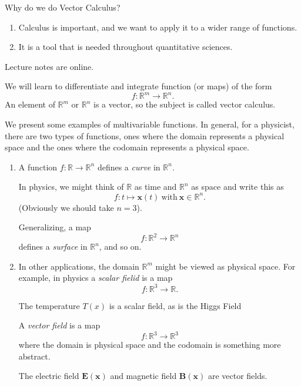 \begin{problem}
Why do we do Vector Calculus?
\end{problem}
\begin{enumerate}
    \item Calculus is important, and we want to apply it to a wider range of functions.
    \item It is a tool that is needed throughout quantitative sciences.
\end{enumerate}
Lecture notes are online.

We will learn to differentiate and integrate function (or maps) of the form
\[
    f: \mathbb{R}^m \to \mathbb{R}^n.
\]
An element of \(\mathbb{R}^m\) or \(\mathbb{R}^n\) is a vector, so the subject is called vector calculus.

We present some examples of multivariable functions. In general, for a physicist, there are two types of functions, ones where the domain represents a physical space and the ones where the codomain represents a physical space.
\begin{enumerate}
    \item A function \(f: \mathbb{R} \to \mathbb{R}^n\) defines a \textit{curve} in \(\mathbb{R}^n\).

    In physics, we might think of \(\mathbb{R}\) as time and \(\mathbb{R}^n\) as space and write this as
    \[
        f: t \mapsto \mathbf{x} (t)~\text{with}~\mathbf{x} \in \mathbb{R}^n.
    \]
    (Obviously we should take \(n = 3\)).

    Generalizing, a map
    \[
        f: \mathbb{R}^2 \to \mathbb{R}^n
    \]
    defines a \textit{surface} in \(\mathbb{R}^n\), and so on.
    \item In other applications, the domain \(\mathbb{R}^m\) might be viewed as physical space. For example, in physics a \textit{scalar fielid} is a map
    \[
        f: \mathbb{R}^3 \to \mathbb{R}.
    \]
    \begin{example}
        The temperature \(T(x)\) is a scalar field, as is the Higgs Field
    \end{example}

    A \textit{vector field} is a map
    \[
        f: \mathbb{R}^3 \to \mathbb{R}^3
    \]
    where the domain is physical space and the codomain is something more abstract.
    \begin{example}
        The electric field \(\mathbf{E} (\mathbf{x})\) and magnetic field \(\mathbf{B} (\mathbf{x} )\) are vector fields.
    \end{example}
\end{enumerate}
